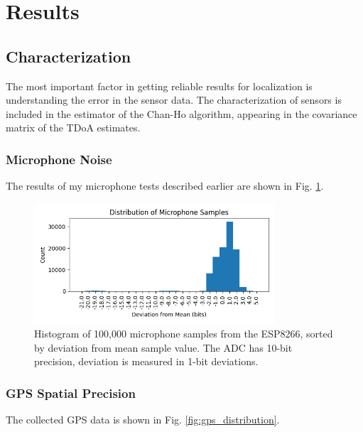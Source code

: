 \documentclass[12pt]{article}
\begin{document}
\section{Results}\label{sec:results}

\subsection{Characterization}

	The most important factor in getting reliable results for localization is understanding the error in the sensor data. The characterization of sensors is included in the estimator of the Chan-Ho algorithm, appearing in the covariance matrix of the TDoA estimates. 

\subsubsection{Microphone Noise}

	The results of my microphone tests described earlier are shown in Fig. \ref{fig:microphone}.

\begin{figure}[h]
\centering
\includegraphics[width=0.8\textwidth]{microphone.png} %
\caption{Histogram of 100,000 microphone samples from the ESP8266, sorted by deviation from mean sample value. The ADC has 10-bit precision, deviation is measured in 1-bit deviations.}
\label{fig:microphone}
\end{figure}

\subsubsection{GPS Spatial Precision}

	The collected GPS data is shown in Fig. \ref{fig:gps_distribution}.
\end{document}
